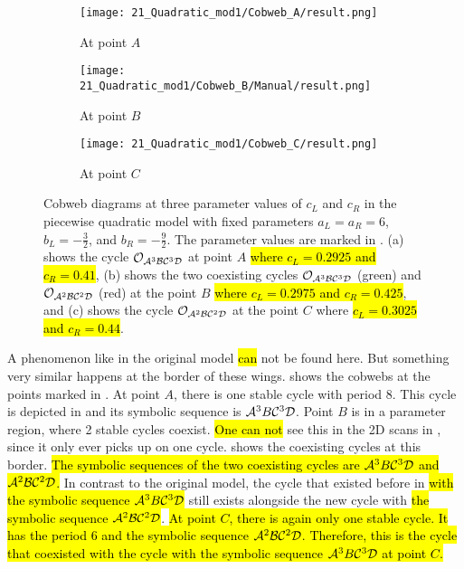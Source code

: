 \begin{figure}
	\centering
	\begin{subfigure}{0.3\textwidth}
		\centering
		\texttt{[image: 21\_Quadratic\_mod1/Cobweb\_A/result.png]}
		\caption{At point $A$}
		\label{fig:setup.quad.even.cobweb.A}
	\end{subfigure}
	\begin{subfigure}{0.3\textwidth}
		\centering
		\texttt{[image: 21\_Quadratic\_mod1/Cobweb\_B/Manual/result.png]}
		\caption{At point $B$}
		\label{fig:setup.quad.even.cobweb.B}
	\end{subfigure}
	\begin{subfigure}{0.3\textwidth}
		\centering
		\texttt{[image: 21\_Quadratic\_mod1/Cobweb\_C/result.png]}
		\caption{At point $C$}
		\label{fig:setup.quad.even.cobweb.C}
	\end{subfigure}
	\caption[Cobwebs of the even quadratic model]{
		Cobweb diagrams at three parameter values of $c_L$ and $c_R$ in the piecewise quadratic model with fixed parameters $a_L = a_R = 6$, $b_L = -\frac{3}{2}$, and $b_R = -\frac{9}{2}$.
		The parameter values are marked in .
		(a) shows the cycle $\mathcal{O}_{\mathcal{A}^3\mathcal{B}\mathcal{C}^3\mathcal{D}}$ at point $A$ \hl{where $c_L = 0.2925$ and $c_R = 0.41$},
		(b) shows the two coexisting cycles $\mathcal{O}_{\mathcal{A}^3\mathcal{B}\mathcal{C}^3\mathcal{D}}$ (green) and $\mathcal{O}_{\mathcal{A}^2\mathcal{B}\mathcal{C}^2\mathcal{D}}$ (red) at the point $B$ \hl{where $c_L = 0.2975$ and $c_R = 0.425$},
		and (c) shows the cycle $\mathcal{O}_{\mathcal{A}^2\mathcal{B}\mathcal{C}^2\mathcal{D}}$ at the point $C$ where \hl{$c_L = 0.3025$ and $c_R = 0.44$}.
	}
	\label{fig:setup.quad.even.cobwebs}
\end{figure}

A phenomenon like in the original model \hl{can} not be found here.
But something very similar happens at the border of these wings.
 shows the cobwebs at the points marked in .
At point $A$, there is one stable cycle with period $8$.
This cycle is depicted in  and its symbolic sequence is $\mathcal{A}^3B\mathcal{C}^3\mathcal{D}$.
Point $B$ is in a parameter region, where 2 stable cycles coexist.
\hl{One can not} see this in the 2D scans in , since it only ever picks up on one cycle.
 shows the coexisting cycles at this border.
\hl{
	The symbolic sequences of the two coexisting cycles are $\mathcal{A}^3B\mathcal{C}^3\mathcal{D}$ and $\mathcal{A}^2\mathcal{B}\mathcal{C}^2\mathcal{D}$.
}
In contrast to the original model, the cycle that existed before in  \hl{with the symbolic sequence $\mathcal{A}^3B\mathcal{C}^3\mathcal{D}$} still exists alongside the new cycle with \hl{the symbolic sequence $\mathcal{A}^2\mathcal{B}\mathcal{C}^2\mathcal{D}$}.
\hl{
	At point $C$, there is again only one stable cycle.
	It has the period $6$ and the symbolic sequence $\mathcal{A}^2\mathcal{B}\mathcal{C}^2\mathcal{D}$.
	Therefore, this is the cycle that coexisted with the cycle with the symbolic sequence $\mathcal{A}^3B\mathcal{C}^3\mathcal{D}$ at point $C$.
}

